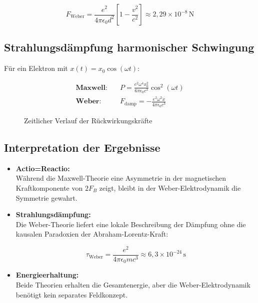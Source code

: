 \begin{equation}
F_{\text{Weber}} = \frac{e^2}{4\pi\epsilon_0 d^2}\left[1 - \frac{v^2}{c^2}\right] \approx 2,\!29\times10^{-8}\,\text{N}
\end{equation}

\subsection{Strahlungsdämpfung harmonischer Schwingung}

Für ein Elektron mit $x(t) = x_0\cos(\omega t)$:

\begin{align}
\textbf{Maxwell:}\quad & P = \frac{e^2\omega^4 x_0^2}{6\pi\epsilon_0 c^3}\cos^2(\omega t) \\
\textbf{Weber:}\quad & F_{\text{damp}} = -\frac{e^2\omega^2\dot{x}}{4\pi\epsilon_0 c^3}
\end{align}

\begin{figure}[ht]
\centering
{}
\caption{Zeitlicher Verlauf der Rückwirkungskräfte}
\end{figure}

\subsection{Interpretation der Ergebnisse}

\begin{itemize}
\item \textbf{Actio=Reactio:}\\Während die Maxwell-Theorie eine Asymmetrie in der magnetischen Kraftkomponente von $2F_B$ zeigt, bleibt in der Weber-Elektrodynamik die Symmetrie gewahrt.

\item \textbf{Strahlungsdämpfung:}\\Die Weber-Theorie liefert eine lokale Beschreibung der Dämpfung ohne die kausalen Paradoxien der Abraham-Lorentz-Kraft:

\begin{equation}
\tau_{\text{Weber}} = \frac{e^2}{4\pi\epsilon_0 m c^3} \approx 6,\!3\times10^{-24}\,\text{s}
\end{equation}

\item \textbf{Energieerhaltung:}\\Beide Theorien erhalten die Gesamtenergie, aber die Weber-Elektrodynamik benötigt kein separates Feldkonzept.
\end{itemize}

